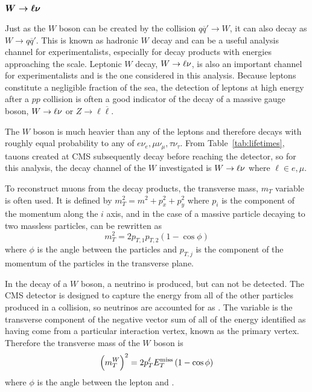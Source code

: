  \subsection[\wln]
 {$\boldsymbol{W\rightarrow\ell\nu}$}
  Just as the $W$ boson can be created by the
   collision $q\overline{q}'\rightarrow W$, 
   it can also decay as $W\rightarrow q\overline{q}'$.
  This is known as hadronic $W$ decay and
   can be a useful analysis channel for experimentalists,
   especially for decay products with energies approaching
   the \TeV scale.
  Leptonic $W$ decay, $W\rightarrow\ell\nu$, is also an important 
   channel for experimentalists and is the
   one considered in this analysis.
  Because leptons constitute a negligible fraction
   of the sea, the detection of leptons at high
   energy after a $pp$ collision is often a good 
   indicator of the decay of a massive gauge boson,
   $W\rightarrow\ell\nu$ or $Z\rightarrow \ell\overline{\ell}$.
  
  The $W$ boson is much heavier than any of the leptons
   and therefore decays with roughly equal probability
   to any of $e\nu_e, \mu\nu_\mu, \tau\nu_\tau$.
  From Table~\ref{tab:lifetimes}, tauons created
   at CMS
   subsequently decay before reaching the 
   detector, so for this analysis, the decay
   channel of the $W$ investigated is
   $W\rightarrow\ell\nu$ where $\ell\in e,\mu$.

 To reconstruct muons from the decay products,
  the transverse mass, $m_T$ variable is
  often used. 
 It is defined by
 $m_T^2 = m^2 + p_x^2 + p_y^2$
  where $p_i$ is the component of the momentum
  along the $i$ axis, and in the case of 
  a massive particle decaying to two massless
  particles, can be rewritten as
\begin{equation}
 m_T^2=2p_{T,1}p_{T,2}\left(1-\cos\phi\right)
\end{equation}
  where $\phi$ is the angle between the particles
  and $p_{T,j}$ is the component of the
  momentum of the particles in the transverse plane.

 In the decay of a $W$ boson, a neutrino 
  is produced, but can not be detected.
 The CMS detector is designed to
  capture the energy from all of the other 
  particles produced in a collision,
  so neutrinos are accounted for as \met.
 The variable \met is the
  transverse component of the negative
  vector sum of all of the 
  energy identified as having come from a particular
  interaction vertex,
  known as the primary vertex.
 Therefore the transverse mass of the $W$
  boson is 
\begin{equation}\label{eq:transversemass}
 \left(m_T^W\right)^2=2p_{T}^\ell E_T^{\mathrm{miss}}\left(1-\cos\phi\right)
\end{equation}
  where $\phi$ is the angle between the lepton
  and \met.

